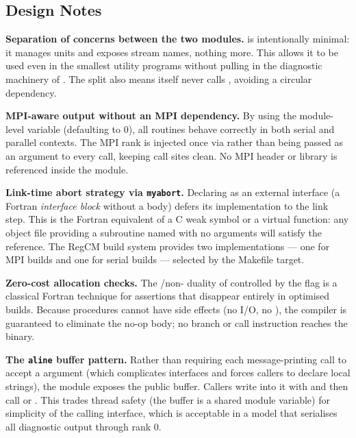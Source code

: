 \subsection{Design Notes}
\label{subsec:stdio_message_design}

\textbf{Separation of concerns between the two modules.}
 is intentionally minimal: it manages units and exposes
stream names, nothing more. This allows it to be used even in the smallest
utility programs without pulling in the diagnostic machinery of
. The split also means  itself never
calls , avoiding a circular dependency.

\textbf{MPI-aware output without an MPI dependency.}
By using the module-level  variable (defaulting to 0), all
 routines behave correctly in both serial and parallel
contexts. The MPI rank is injected once via  rather than
being passed as an argument to every call, keeping call sites clean. No MPI
header or library is referenced inside the module.

\textbf{Link-time abort strategy via \texttt{myabort}.}
Declaring  as an external interface (a Fortran \emph{interface
block} without a body) defers its implementation to the link step.
This is the Fortran equivalent of a C weak symbol or a virtual function:
any object file providing a subroutine named  with no arguments
will satisfy the reference. The RegCM build system provides two implementations
--- one for MPI builds and one for serial builds --- selected by the Makefile
target.

\textbf{Zero-cost allocation checks.}
The /non- duality of  controlled by
the  flag is a classical Fortran technique for assertions that
disappear entirely in optimised builds. Because  procedures cannot
have side effects (no I/O, no ), the compiler is guaranteed to
eliminate the no-op body; no branch or call instruction reaches the binary.

\textbf{The \texttt{aline} buffer pattern.}
Rather than requiring each message-printing call to accept a
 argument (which complicates interfaces and forces callers
to declare local strings), the module exposes the public  buffer.
Callers write into it with  and then call
 or . This trades thread safety (the buffer is a shared
module variable) for simplicity of the calling interface, which is acceptable
in a model that serialises all diagnostic output through rank 0.

